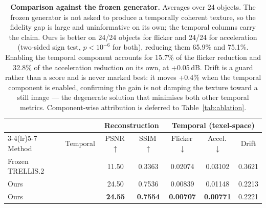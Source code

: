 \newcommand{\cmark}{\ding{51}}   %
\newcommand{\xmark}{\ding{55}}
\begin{table}[t]
\centering
\small
\setlength{\tabcolsep}{4.5pt}
\begin{tabular}{lcccccc}
\toprule
& & \multicolumn{2}{c}{Reconstruction} & \multicolumn{3}{c}{Temporal (texel-space)} \\
\cmidrule(lr){3-4}\cmidrule(lr){5-7}
Method & Temporal & PSNR\,$\uparrow$ & SSIM\,$\uparrow$ & Flicker\,$\downarrow$ & Accel.\,$\downarrow$ & Drift \\
\midrule
Frozen TRELLIS.2 & \xmark & 11.50 & 0.3363 & 0.02074 & 0.03102 & 0.3621 \\
\midrule
Ours & \xmark & 24.50 & 0.7536 & 0.00839 & 0.01148 & 0.2213 \\
Ours & \cmark & \textbf{24.55} & \textbf{0.7554} & \textbf{0.00707} & \textbf{0.00771} & 0.2221 \\
\bottomrule
\end{tabular}
\caption{\textbf{Comparison against the frozen generator.} Averages over
24 objects. The frozen generator is not asked to produce a temporally coherent
texture, so the fidelity gap is large and uninformative on its own; the temporal columns
carry the claim. Ours is better on 24/24 objects for flicker and
24/24 for acceleration (two-sided sign test, $p < 10^{-6}$ for both),
reducing them 65.9\% and 75.1\%. Enabling the
temporal component accounts for 15.7\% of the flicker reduction and
32.8\% of the acceleration reduction on its own, at
+0.05\,dB. Drift is a guard rather than a score and is
never marked best: it moves +0.4\% when the temporal component is
enabled, confirming the gain is not damping the texture toward a still image --- the
degenerate solution that minimises both other temporal metrics. Component-wise attribution
is deferred to Table~\ref{tab:ablation}.}
\label{tab:comparison}
\end{table}
